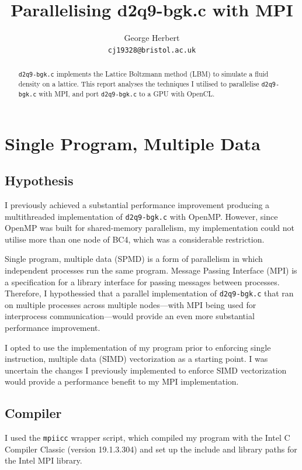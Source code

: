 \documentclass[twocolumn, a4paper]{article}
\author{
  George Herbert\\
  \texttt{cj19328@bristol.ac.uk}
}
\title{\vspace{-2em}Parallelising d2q9-bgk.c with MPI}
\begin{document}
\maketitle

\begin{abstract}
  \texttt{d2q9-bgk.c} implements the Lattice Boltzmann method (LBM) to simulate a fluid density on a lattice.
  This report analyses the techniques I utilised to parallelise \texttt{d2q9-bgk.c} with MPI, and port \texttt{d2q9-bgk.c} to a GPU with OpenCL.
\end{abstract}

\section{Single Program, Multiple Data}

\subsection{Hypothesis}

I previously achieved a substantial performance improvement producing a multithreaded implementation of \texttt{d2q9-bgk.c} with OpenMP.
However, since OpenMP was built for shared-memory parallelism, my implementation could not utilise more than one node of BC4, which was a considerable restriction.

Single program, multiple data (SPMD) is a form of parallelism in which independent processes run the same program.
Message Passing Interface (MPI) is a specification for a library interface for passing messages between processes.
Therefore, I hypothessied that a parallel implementation of \texttt{d2q9-bgk.c} that ran on multiple processes across multiple nodes---with MPI being used for interprocess communication---would provide an even more substantial performance improvement.

I opted to use the implementation of my program prior to enforcing single instruction, multiple data (SIMD) vectorization as a starting point.
I was uncertain the changes I previously implemented to enforce SIMD vectorization would provide a performance benefit to my MPI implementation.

\subsection{Compiler}

I used the \texttt{mpiicc} wrapper script, which compiled my program with the Intel C Compiler Classic (version 19.1.3.304) and set up the include and library paths for the Intel MPI library.
\end{document}
